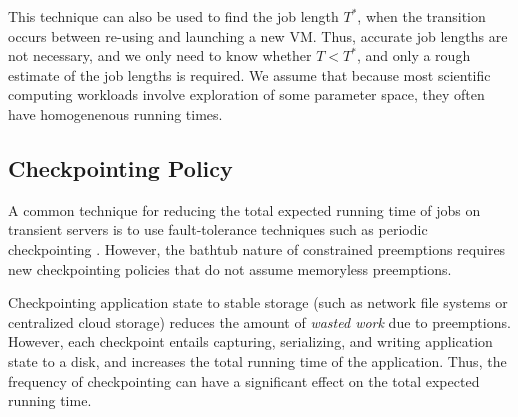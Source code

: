 This technique can also be used to find the job length $T^*$, when the transition occurs between re-using and launching a new VM.
Thus, accurate job lengths are not necessary, and we only need to know whether $T<T^*$, and only a rough estimate of the job lengths is required. 
We assume that because most scientific computing workloads involve exploration of some parameter space, they often have homogenenous running times. 


\begin{comment}
Our job scheduling policy uses the preemption model to determine the preemption probability of jobs of a given length $T$. 
Assume that the running VM's age (time since launch) is $s$. 
Then, the the probability of failure on the existing VM, $P_{\text{Existing}} = max(1, F(T+s) - F(T))$.  
The alternative is to discard the VM and launch a new VM, in which case, the failure probability is $P_{\text{New}} = F(T)$.
Depending on the VM's age $s$ and the job's running time $T$, we can compare $P_{\text{Existing}}$ and $P_{\text{New}}$, and run the job on whichever case yields the lower failure probability. 
\end{comment}



\vspace*{\subsecspace}
\subsection{Checkpointing Policy}


A common technique for reducing the total expected running time of jobs on transient servers is to use fault-tolerance techniques such as periodic checkpointing \cite{flint}.
%
However, the bathtub nature of constrained preemptions requires new checkpointing policies that do not assume memoryless preemptions. 


Checkpointing application state to stable storage (such as network file systems or centralized cloud storage) reduces the amount of \emph{wasted work} due to preemptions.
However, each checkpoint entails capturing, serializing, and writing application state to a disk, and increases the total running time of the application.
Thus, the frequency of checkpointing can have a significant effect on the total expected running time.

